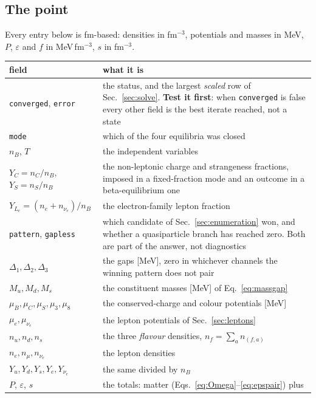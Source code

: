 \documentclass[aps,prc,onecolumn,superscriptaddress,nofootinbib,10pt]{revtex4-2}
\newcommand{\nB}{n_B}
\newcommand{\nC}{n_C}
\newcommand{\nS}{n_S}
\newcommand{\muB}{\mu_B}
\newcommand{\muC}{\mu_C}
\newcommand{\muS}{\mu_S}
\begin{document}
\subsection{The point}

Every entry below is fm-based: densities in fm$^{-3}$, potentials and masses in
MeV, $P$, $\varepsilon$ and $f$ in MeV\,fm$^{-3}$, $s$ in fm$^{-3}$.

\begin{center}
\begin{tabular}{@{}l p{}@{}}
\toprule
field & what it is \\
\midrule
\texttt{converged}, \texttt{error}
  & the status, and the largest \emph{scaled} row of
    Sec.~\ref{sec:solve}. \textbf{Test it first}: when \texttt{converged} is
    false every other field is the best iterate reached, not a state \\
\texttt{mode}
  & which of the four equilibria was closed \\
\midrule
$\nB$, $T$
  & the independent variables \\
$Y_C = \nC/\nB$, $Y_S = \nS/\nB$
  & the non-leptonic charge and strangeness fractions,
    imposed in a fixed-fraction mode and an outcome in a beta-equilibrium one \\
$Y_{L_e} = (n_e + n_{\nu_e})/\nB$
  & the electron-family lepton fraction \\
\midrule
\texttt{pattern}, \texttt{gapless}
  & which candidate of Sec.~\ref{sec:enumeration} won, and whether a
    quasiparticle branch has reached zero. Both are part of the answer, not
    diagnostics \\
$\Delta_1, \Delta_2, \Delta_3$
  & the gaps [MeV], zero in whichever channels the winning pattern does not
    pair \\
$M_u, M_d, M_s$
  & the constituent masses [MeV] of Eq.~\eqref{eq:massgap} \\
\midrule
$\muB, \muC, \muS, \mu_3, \mu_8$
  & the conserved-charge and colour potentials [MeV] \\
$\mu_e, \mu_{\nu_e}$
  & the lepton potentials of Sec.~\ref{sec:leptons} \\
\midrule
$n_u, n_d, n_s$
  & the three \emph{flavour} densities, $n_f = \sum_a n_{(f,a)}$ \\
$n_e, n_\mu, n_{\nu_e}$
  & the lepton densities \\
$Y_u, Y_d, Y_s, Y_e, Y_{\nu_e}$
  & the same divided by $\nB$ \\
\midrule
$P$, $\varepsilon$, $s$
  & the totals: matter (Eqs.~\eqref{eq:Omega}--\eqref{eq:epspair}) plus

\end{tabular}
\end{center}
\end{document}
